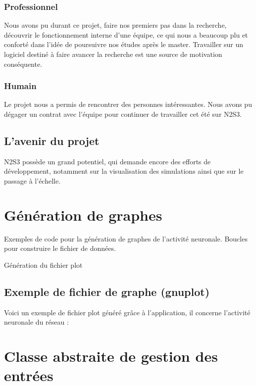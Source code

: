 \documentclass[a4paper,10pt]{article}
\begin{document}
\subsubsection*{Professionnel}
Nous avons pu durant ce projet, faire nos premiers pas dans la recherche, découvrir le fonctionnement interne d'une équipe, ce qui nous a beaucoup plu et conforté dans l'idée de poursuivre nos études après le master. Travailler sur un logiciel destiné à faire avancer la recherche est une source de motivation conséquente.

\subsubsection*{Humain}
Le projet nous a permis de rencontrer des personnes intéressantes. Nous avons pu dégager un contrat avec l'équipe pour continuer de travailler cet été sur N2S3.

\subsection*{L'avenir du projet}
N2S3 possède un grand potentiel, qui demande encore des efforts de développement, notamment sur la visualisation des simulations ainsi que sur le passage à l'échelle.

\newpage

\appendix
\section{Génération de graphes}
Exemples de code pour la génération de graphes de l'activité neuronale.
\label{gen_graph}
Boucles pour construire le fichier de données.

Génération du fichier plot

\subsection{Exemple de fichier de graphe (gnuplot)}
Voici un exemple de fichier plot généré grâce à l'application, il concerne l'activité neuronale du réseau : 


\section{Classe abstraite de gestion des entrées}
\label{input_generator}

\end{document}
